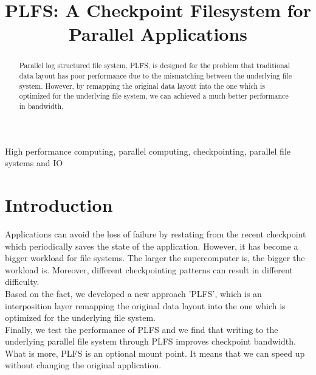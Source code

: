 \documentclass[conference]{IEEEtran}
\begin{document}
\title{PLFS: A Checkpoint Filesystem for Parallel Applications\\
}

\author{
}

\maketitle

\begin{abstract}
Parallel log structured file system, PLFS, is designed for the problem that traditional data layout has poor performance due to the mismatching between the underlying file system. However, by remapping the original data layout into the one which is optimized for the underlying file system, we can achieved a much better performance in bandwidth,
\end{abstract}

\begin{IEEEkeywords}
High performance computing, parallel computing, checkpointing, parallel file systems and IO
\end{IEEEkeywords}

\section{Introduction}
Applications can avoid the loss of failure by restating from the recent checkpoint which periodically saves the state of the application. However, it has become a bigger workload for file systems. The larger the supercomputer is, the bigger the workload is. Moreover, different checkpointing patterns can result in different difficulty.
\\Based on the fact, we developed a new approach 'PLFS', which is an interposition layer remapping the original data layout into the one which is optimized for the underlying file system.
\\Finally, we test the performance of PLFS and we find that writing to the underlying parallel file system through PLFS improves checkpoint bandwidth. What is more, PLFS is an optional mount point. It means that we can speed up without changing the original application.
\end{document}
